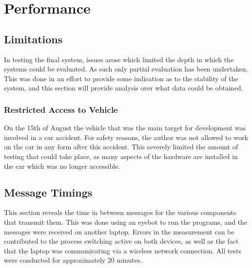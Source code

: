 
\chapter{Performance} %



\ifpdf
    \graphicspath{{7/figures/PNG/}{7/figures/PDF/}{7/figures/}}
\else
    \graphicspath{{7/figures/EPS/}{7/figures/}}
\fi




\section{Limitations}

In testing the final system, issues arose which limited the depth in which the systems could be evaluated. As such only partial evaluation has been undertaken. This was done in an effort to provide some indication as to the stability of the system, and this section will provide analysis over what data could be obtained.

\subsection{Restricted Access to Vehicle}
\label{sec:access}
On the 15th of August the vehicle that was the main target for development was involved in a car accident. For safety reasons, the author was not allowed to work on the car in any form after this accident. This severely limited the amount of testing that could take place, as many aspects of the hardware are installed in the car which was no longer accessible.

\section{Message Timings}

This section reveals the time in between messages for the various components that transmit them. This was done using an eyebot to run the programs, and the messages were received on another laptop. Errors in the measurement can be contributed to the process switching active on both devices, as well as the fact that the laptop was communicating via a wireless network connection. All tests were conducted for approximately 20 minutes.

